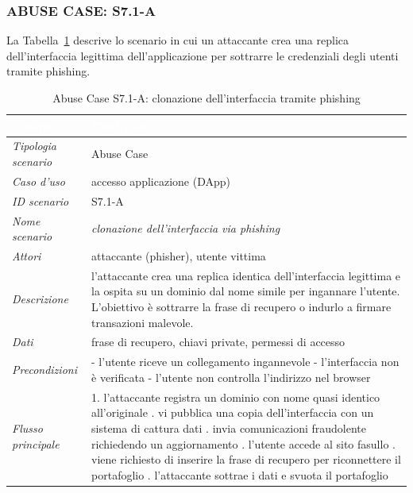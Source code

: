 \subsubsection*{ABUSE CASE: S7.1-A}
La Tabella~\ref{tab:s71a} descrive lo scenario in cui un attaccante crea una replica dell'interfaccia legittima dell'applicazione per sottrarre le credenziali degli utenti tramite phishing.
\begin{longtable}{| >{\columncolor{abuseCol}}p{} | p{} |}
\caption{Abuse Case S7.1-A: clonazione dell'interfaccia tramite phishing}\label{tab:s71a}\\
\hline
\rowcolor{abuseHeader} \textcolor{white}{\textit{Campo}} & \textcolor{white}{\textit{Contenuto}} \\
\hline
\textit{Tipologia scenario} & Abuse Case \\
\hline
\textit{Caso d'uso} & accesso applicazione (DApp) \\
\hline
\textit{ID scenario} & S7.1-A \\
\hline
\textit{Nome scenario} & \textit{clonazione dell'interfaccia via phishing} \\
\hline
\textit{Attori} & attaccante (phisher), utente vittima \\
\hline
\textit{Descrizione} & l'attaccante crea una replica identica dell'interfaccia legittima e la ospita su un dominio dal nome simile per ingannare l'utente. L'obiettivo è sottrarre la frase di recupero o indurlo a firmare transazioni malevole. \\
\hline
\textit{Dati} & frase di recupero, chiavi private, permessi di accesso \\
\hline
\textit{Precondizioni} & - l'utente riceve un collegamento ingannevole \newline - l'interfaccia non è verificata \newline - l'utente non controlla l'indirizzo nel browser \\
\hline
\textit{Flusso principale} & 1. l'attaccante registra un dominio con nome quasi identico all'originale \newline 2. vi pubblica una copia dell'interfaccia con un sistema di cattura dati \newline 3. invia comunicazioni fraudolente richiedendo un aggiornamento \newline 4. l'utente accede al sito fasullo \newline 5. viene richiesto di inserire la frase di recupero per riconnettere il portafoglio \newline 6. l'attaccante sottrae i dati e svuota il portafoglio \\

\end{longtable}
